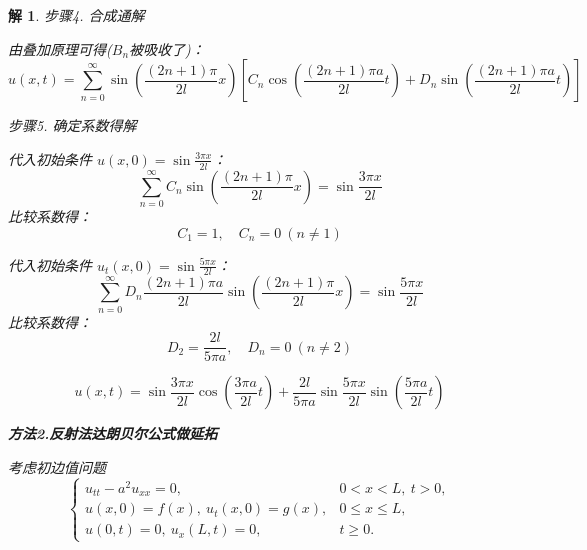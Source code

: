 \documentclass[12pt,a4paper]{article}
\newtheorem*{solution}{解}
\begin{document}
\begin{solution}
	步骤4. 合成通解
		
	\noindent
	由叠加原理可得($B_n$被吸收了)：
	\[
	u(x,t) = \sum_{n=0}^\infty \sin\left( \frac{(2n+1)\pi}{2l} x \right) \left[ C_n \cos\left( \frac{(2n+1)\pi a}{2l} t \right) + D_n \sin\left( \frac{(2n+1)\pi a}{2l} t \right) \right]
	\]
	
步骤5. 确定系数得解
		
	\noindent
	代入初始条件 \( u(x,0) = \sin\frac{3\pi x}{2l} \)：
	\[
	\sum_{n=0}^\infty C_n \sin\left( \frac{(2n+1)\pi}{2l} x \right) = \sin\frac{3\pi x}{2l}
	\]
	比较系数得：
	\[
	C_1 = 1,\quad C_n = 0\ (n \neq 1)
	\]
	
	代入初始条件 \( u_t(x,0) = \sin\frac{5\pi x}{2l} \)：
	\[
	\sum_{n=0}^\infty D_n \frac{(2n+1)\pi a}{2l} \sin\left( \frac{(2n+1)\pi}{2l} x \right) = \sin\frac{5\pi x}{2l}
	\]
	比较系数得：
	\[
	D_2 = \frac{2l}{5\pi a},\quad D_n = 0\ (n \neq 2)
	\]
	
	\[
	u(x,t) = \sin\frac{3\pi x}{2l} \cos\left( \frac{3\pi a}{2l} t \right) + \frac{2l}{5\pi a} \sin\frac{5\pi x}{2l} \sin\left( \frac{5\pi a}{2l} t \right)
	\]
	
	
	\newpage
	\textbf{方法2.反射法达朗贝尔公式做延拓}


考虑初边值问题
\begin{equation*}
	\begin{cases}
		u_{tt} - a^2 u_{xx} = 0, & 0 < x < L, \ t > 0, \\
		u(x, 0) = f(x), \ u_t(x, 0) = g(x), & 0 \leq x \leq L, \\
		u(0, t) = 0, \ u_x(L, t) = 0, & t \geq 0.
	\end{cases}
\end{equation*}
	

\end{solution}
\end{document}
